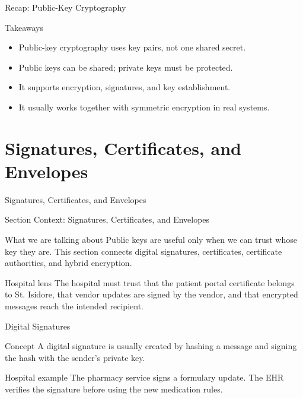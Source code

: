 \documentclass[presentation]{beamer}
\newcommand{\sectiontitleframe}[1]{
\begin{frame}[plain,c]
\begin{center}
{\usebeamerfont{title}\usebeamercolor[fg]{title}#1}
\end{center}
\end{frame}
}
\begin{document}
\begin{frame}[c]{Recap: Public-Key Cryptography}
\begin{block}{Takeaways}
\begin{itemize}
    \item Public-key cryptography uses key pairs, not one shared secret.
    \item Public keys can be shared; private keys must be protected.
    \item It supports encryption, signatures, and key establishment.
    \item It usually works together with symmetric encryption in real systems.
\end{itemize}
\end{block}
\end{frame}

\section{Signatures, Certificates, and Envelopes}
\sectiontitleframe{Signatures, Certificates, and Envelopes}

\begin{frame}[c]{Section Context: Signatures, Certificates, and Envelopes}
\begin{block}{What we are talking about}
Public keys are useful only when we can trust whose key they are. This section connects digital
signatures, certificates, certificate authorities, and hybrid encryption.
\end{block}

\begin{exampleblock}{Hospital lens}
The hospital must trust that the patient portal certificate belongs to St. Isidore, that vendor
updates are signed by the vendor, and that encrypted messages reach the intended recipient.
\end{exampleblock}
\end{frame}

\begin{frame}[c]{Digital Signatures}
\begin{block}{Concept}
A digital signature is usually created by hashing a message and signing the hash with the sender's
private key.
\end{block}

\begin{exampleblock}{Hospital example}
The pharmacy service signs a formulary update. The EHR verifies the signature before using the new
medication rules.
\end{exampleblock}
\end{frame}
\end{document}
